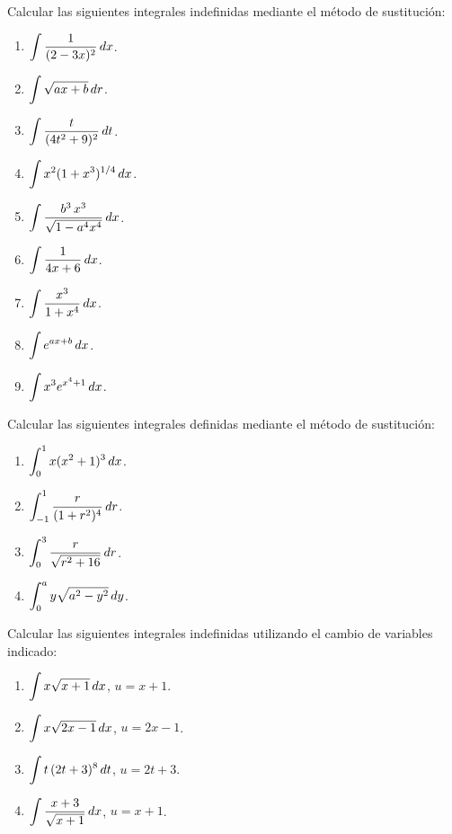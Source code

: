\item Calcular las siguientes integrales indefinidas mediante el método de sustitución:

\begin{multicols}{2}
  \begin{enumerate}
    \item $\displaystyle \int \frac{1}{(2-3x)^2} \,dx$.
    \item $\displaystyle \int \sqrt{ax+b} \,dr$.
    \item $\displaystyle \int \frac{t}{(4t^2+9)^2} \,dt$.
    \item $\displaystyle \int x^2 (1+x^3)^{1/4} \,dx$.
    \item $\displaystyle \int \frac{b^3 \, x^3}{\sqrt{1-a^4x^4}} \,dx$.
    \item $\displaystyle \int \frac{1}{4x+6}\,dx$.
    \item $\displaystyle \int \frac{x^3}{1+x^4}\,dx$.
    \item $\displaystyle \int e^{ax+b}\,dx$.
    \item $\displaystyle \int x^3 e^{x^4+1}\,dx$.
  \end{enumerate}
\end{multicols}

\item Calcular las siguientes integrales definidas mediante el método de sustitución:

\begin{multicols}{2}
  \begin{enumerate}
    \item $\displaystyle \int_{0}^{1} x(x^2+1)^3 \,dx$.
    \item $\displaystyle \int_{-1}^{1} \frac{r}{(1+r^2)^4} \,dr$.
    \item $\displaystyle \int_{0}^{3} \frac{r}{\sqrt{r^2+16}}  \,dr$.
    \item $\displaystyle \int_{0}^{a} y\sqrt{a^2-y^2} \,dy$.
  \end{enumerate}
\end{multicols}

\item Calcular las siguientes integrales indefinidas utilizando el cambio de variables indicado:

\begin{multicols}{2}
  \begin{enumerate}
    \item $\displaystyle \int x \sqrt{x+1} \,dx $, $u = x+1$.
    \item $\displaystyle \int x \sqrt{2x-1} \,dx $, $u = 2x-1$.
    \item $\displaystyle \int t\,(2t+3)^8 \,dt $, $u = 2t+3$.
    \item $\displaystyle \int \frac{x+3}{\sqrt{x+1}}\,dx $, $u = x+1$.
  \end{enumerate}
\end{multicols}